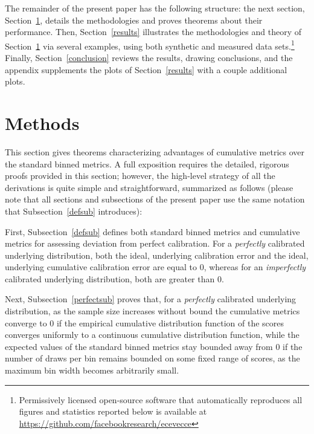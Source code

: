 \documentclass{article}
\begin{document}
The remainder of the present paper has the following structure:
the next section, Section~\ref{methods},
details the methodologies and proves theorems about their performance.
Then, Section~\ref{results} illustrates the methodologies and theory
of Section~\ref{methods} via several examples, using both synthetic
and measured data sets.\footnote{Permissively licensed open-source software
that automatically reproduces all figures and statistics reported below
is available at \url{https://github.com/facebookresearch/ecevecce}}
Finally, Section~\ref{conclusion} 
reviews the results, drawing conclusions, and the appendix supplements
the plots of Section~\ref{results} with a couple additional plots.



\section{Methods}
\label{methods}

This section gives theorems characterizing advantages of cumulative metrics
over the standard binned metrics. A full exposition requires
the detailed, rigorous proofs provided in this section; however,
the high-level strategy of all the derivations is quite simple
and straightforward, summarized as follows (please note that all sections
and subsections of the present paper use the same notation
that Subsection~\ref{defsub} introduces):

First, Subsection~\ref{defsub} defines both standard binned metrics
and cumulative metrics for assessing deviation from perfect calibration.
For a {\it perfectly} calibrated underlying distribution,
both the ideal, underlying calibration error
and the ideal, underlying cumulative calibration error are equal to 0,
whereas for an {\it imperfectly} calibrated underlying distribution,
both are greater than 0.

Next, Subsection~\ref{perfectsub} proves that,
for a {\it perfectly} calibrated underlying distribution,
as the sample size increases without bound
the cumulative metrics converge to 0
if the empirical cumulative distribution function of the scores
converges uniformly to a continuous cumulative distribution function,
while the expected values
of the standard binned metrics stay bounded away from 0
if the number of draws per bin remains bounded on some fixed range of scores,
as the maximum bin width becomes arbitrarily small.
\end{document}
